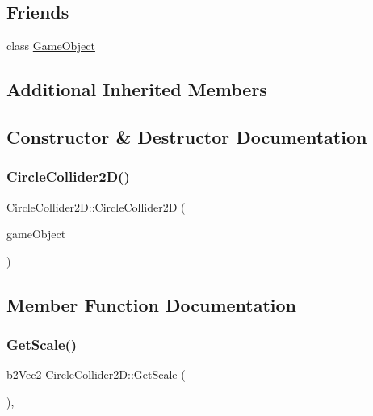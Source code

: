 \subsection*{Friends}
\begin{DoxyCompactItemize}
\item 
class \hyperlink{class_mason_1_1_circle_collider2_d_a00df87c957d8f7ee0fc51f07a0542f4a}{Game\+Object}
\end{DoxyCompactItemize}
\subsection*{Additional Inherited Members}


\subsection{Constructor \& Destructor Documentation}
\hypertarget{class_mason_1_1_circle_collider2_d_ac713c4259ab552c74b291d0e17f0e98a}{}\label{class_mason_1_1_circle_collider2_d_ac713c4259ab552c74b291d0e17f0e98a} 
\subsubsection{\texorpdfstring{Circle\+Collider2\+D()}{CircleCollider2D()}}
{\footnotesize\ttfamily Circle\+Collider2\+D\+::\+Circle\+Collider2D (\begin{DoxyParamCaption}\item[{\hyperlink{class_mason_1_1_game_object}{Game\+Object} $\ast$}]{game\+Object }\end{DoxyParamCaption})\hspace{0.3cm}{\ttfamily [protected]}}



\subsection{Member Function Documentation}
\hypertarget{class_mason_1_1_circle_collider2_d_a4aa06f3ff8f00445a78f6b6a8b479ad0}{}\label{class_mason_1_1_circle_collider2_d_a4aa06f3ff8f00445a78f6b6a8b479ad0} 
\subsubsection{\texorpdfstring{Get\+Scale()}{GetScale()}}
{\footnotesize\ttfamily b2\+Vec2 Circle\+Collider2\+D\+::\+Get\+Scale (\begin{DoxyParamCaption}{ }\end{DoxyParamCaption})\hspace{0.3cm}{\ttfamily [override]}, {\ttfamily [virtual]}}




